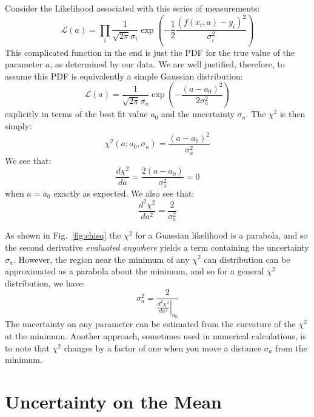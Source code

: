 \documentclass[12pt,oneside]{book}
\begin{document}
Consider the Likelihood associated with this series of measurements:
\begin{displaymath}
\mathcal{L}(a) = \prod_i \frac{1}{\sqrt{2\pi} \sigma_i} \exp\left(-\frac{1}{2} \frac{(f(x_i,a)-y_i)^2}{\sigma_i^2}\right)
\end{displaymath}
This complicated function in the end is just the PDF for the true value of the parameter $a$, as determined by our data.  We are well justified, therefore, to assume this PDF is equivalently a simple Gaussian distribution: 
\begin{displaymath}
\mathcal{L}(a) =  \frac{1}{\sqrt{2\pi} \sigma_a} \exp\left(-\frac{(a-a_0)^2}{2\sigma_a^2}\right)
\end{displaymath}
explicitly in terms of the best fit value $a_0$ and the uncertainty $\sigma_a$.  The $\chi^2$ is then simply:
\begin{equation} \label{eqn:chisqa}
\chi^2(a; a_0, \sigma_a) = \frac{(a-a_0)^2}{\sigma_a^2}
\end{equation}
We see that:
\begin{displaymath}
\frac{d\chi^2}{da} = \frac{2 (a-a_0)}{\sigma_a^2} = 0
\end{displaymath}
when $a=a_0$ exactly as expected.  We also see that:
\begin{displaymath}
\frac{d^2\chi^2}{da^2} = \frac{2}{\sigma_a^2}
\end{displaymath}

As shown in Fig.~\ref{fig:chisq} the $\chi^2$ for a Guassian likelihood is a parabola, and so the second derivative {\em evaluated anywhere} yields a term containing the uncertainty $\sigma_a$.  However, the region near the minimum of any $\chi^2$ can distribution can be approximated as a parabola about the minimum, and so for a general $\chi^2$ distribution, we have:
\begin{equation} \label{eqn:chisqunc}
\sigma_a^2  = \frac{2}{\left. \frac{d^2\chi^2}{da^2} \right|_{a_0}}
\end{equation}
The uncertainty on any parameter can be estimated from the curvature of the $\chi^2$ at the minimum.
Another approach, sometimes used in numerical calculations, is to note that $\chi^2$ changes by a factor of one when you move a distance $\sigma_a$ from the minimum.

\section{Uncertainty on the Mean}
\end{document}
